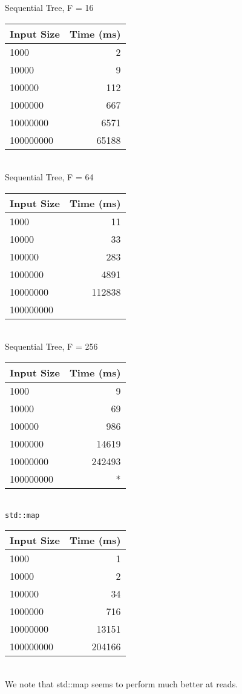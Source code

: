 \documentclass{sig-alternate}
\begin{document}
Sequential Tree, F = 16\\
\begin{tabular}{| l | r |}
  \hline
  Input Size & Time (ms)\\  \hline
  1000			&	2	\\
  10000			&	9	\\
  100000		&	112	\\
  1000000		&	667	\\
  10000000		&	6571	\\
  100000000		&	65188	\\
  \hline
\end{tabular} \\

Sequential Tree, F = 64\\
\begin{tabular}{| l | r |}
  \hline
  Input Size & Time (ms)\\  \hline
  1000			&	11	\\
  10000			&	33	\\
  100000		&	283	\\
  1000000		&	4891	\\
  10000000		&	112838	\\
  100000000		&	\\
  \hline
\end{tabular} \\

Sequential Tree, F = 256\\
\begin{tabular}{| l | r |}
  \hline
  Input Size & Time (ms)\\  \hline
  1000			&	9	\\
  10000			&	69	\\
  100000		&	986	\\
  1000000		&	14619	\\
  10000000		&	242493	\\
  100000000		&	*	\\
  \hline
\end{tabular}\\

\texttt{std::map}\\
\begin{tabular}{| l | r |}
  \hline
  Input Size & Time (ms)\\  \hline
  1000			&	1	\\
  10000			&	2	\\
  100000		&	34	\\
  1000000		&	716	\\
  10000000		&	13151	\\
  100000000		&	204166	\\
  \hline
\end{tabular}\\
We note that std::map seems to perform much better at reads.
\end{document}
